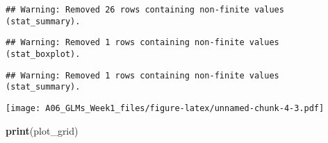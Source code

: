 \documentclass[]{article}
\newenvironment{Shaded}{\begin{snugshade}}{\end{snugshade}}
\newcommand{\KeywordTok}[1]{\textcolor[rgb]{0.13,0.29,0.53}{\textbf{#1}}}
\newcommand{\NormalTok}[1]{#1}
\begin{document}
\begin{verbatim}
## Warning: Removed 26 rows containing non-finite values (stat_summary).
\end{verbatim}

\begin{verbatim}
## Warning: Removed 1 rows containing non-finite values (stat_boxplot).
\end{verbatim}

\begin{verbatim}
## Warning: Removed 1 rows containing non-finite values (stat_summary).
\end{verbatim}

\texttt{[image: A06\_GLMs\_Week1\_files/figure-latex/unnamed-chunk-4-3.pdf]}

\begin{Shaded}
\begin{Highlighting}[]
\KeywordTok{print}\NormalTok{(plot_grid)}
\end{Highlighting}
\end{Shaded}
\end{document}
